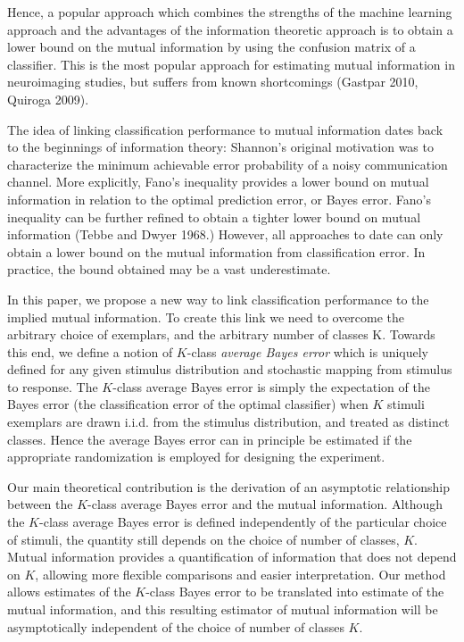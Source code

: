 \documentclass[12pt]{article}
\begin{document}
Hence, a popular approach which combines the strengths of the machine
learning approach and the advantages of the information theoretic
approach is to obtain a lower bound on the mutual information by using
the confusion matrix of a classifier.  This is the most popular
approach for estimating mutual information in neuroimaging studies,
but suffers from known shortcomings (Gastpar 2010, Quiroga 2009).

The idea of linking classification performance to mutual information
dates back to the beginnings of information theory: Shannon's original
motivation was to characterize the minimum achievable error
probability of a noisy communication channel.  More explicitly, Fano's
inequality provides a lower bound on mutual information in relation to
the optimal prediction error, or Bayes error.  Fano's inequality can
be further refined to obtain a tighter lower bound on mutual
information (Tebbe and Dwyer 1968.)  However, all approaches to date
can only obtain a lower bound on the mutual information from
classification error.  In practice, the bound obtained may be a vast
underestimate.

In this paper, we propose a new way to link classification performance
to the implied mutual information. 
To create this link we need to overcome the arbitrary choice of
exemplars, and the arbitrary number of classes K.  Towards this end,
we define a notion of $K$-class \emph{average Bayes error} which is
uniquely defined for any given stimulus distribution and stochastic
mapping from stimulus to response.  The $K$-class average Bayes error
is simply the expectation of the Bayes error (the classification error
of the optimal classifier) when $K$ stimuli exemplars are drawn
i.i.d. from the stimulus distribution, and treated as distinct
classes.  Hence the average Bayes error can in principle be estimated
if the appropriate randomization is employed for designing the
experiment.

Our main theoretical contribution is the derivation of an asymptotic
relationship between the $K$-class average Bayes error and the mutual
information. Although the $K$-class average Bayes error is defined
independently of the particular choice of stimuli, the quantity still
depends on the choice of number of classes, $K$. Mutual information
provides a quantification of information that does not depend on $K$,
allowing more flexible comparisons and easier interpretation. Our
method allows estimates of the $K$-class Bayes error to be translated
into estimate of the mutual information, and this resulting estimator
of mutual information will be asymptotically independent of the choice
of number of classes $K$.
\end{document}
